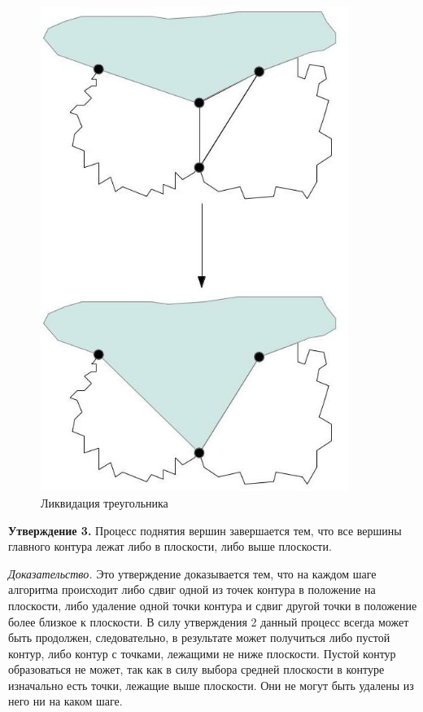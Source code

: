 \documentclass[a4paper,12pt, titlepage]{article}
\begin{document}
\begin{flushleft}
  \begin{figure}[h]
    \includegraphics[width=10cm]{img/contour-3.jpg}
    \caption{Ликвидация треугольника}\label{contour-3}
  \end{figure}
\end{flushleft}

\begin{flushleft}
 \textbf{Утверждение 3.} Процесс поднятия вершин завершается тем, что все вершины главного контура лежат
либо в плоскости, либо выше плоскости.
\end{flushleft}

\begin{flushleft}
 \textit{Доказательство.} Это утверждение доказывается тем, что на каждом шаге алгоритма происходит либо 
сдвиг одной из точек контура в положение на плоскости, либо удаление одной точки контура и сдвиг другой точки
в положение более близкое к плоскости. В силу утверждения 2 данный процесс всегда может быть продолжен,
следовательно, в результате может получиться либо пустой контур, либо контур с точками, лежащими не ниже
плоскости. Пустой контур образоваться не может, так как в силу выбора средней плоскости в контуре изначально есть
точки, лежащие выше плоскости. Они не могут быть удалены из него ни на каком шаге.
\end{flushleft}
\end{document}
